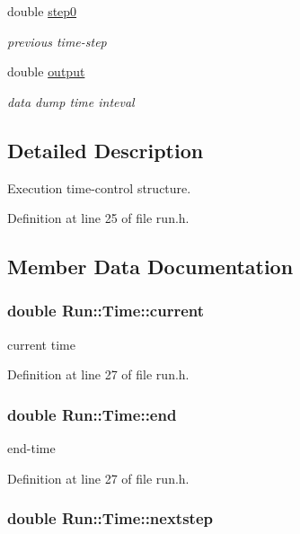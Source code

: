 \begin{CompactItemize}
double \hyperlink{structRun_1_1Time_f061d3f8babfe196d06003e34bc23b42}{step0}
\begin{CompactList}\small\item\em previous time-step \item\end{CompactList}\item 
double \hyperlink{structRun_1_1Time_f8cf74f66df79569a1b50da8b8fbe45f}{output}
\begin{CompactList}\small\item\em data dump time inteval \item\end{CompactList}\end{CompactItemize}


\subsection{Detailed Description}
Execution time-control structure. 

Definition at line 25 of file run.h.

\subsection{Member Data Documentation}
\hypertarget{structRun_1_1Time_e620752b0a0b7f8f5bf209ae4c978aad}{
\subsubsection[{current}]{\setlength{\rightskip}{0pt plus 5cm}double {\bf Run::Time::current}}}
\label{structRun_1_1Time_e620752b0a0b7f8f5bf209ae4c978aad}


current time 



Definition at line 27 of file run.h.\hypertarget{structRun_1_1Time_7cffeec5b6e31da1fa8c3edbea5ec35c}{
\subsubsection[{end}]{\setlength{\rightskip}{0pt plus 5cm}double {\bf Run::Time::end}}}
\label{structRun_1_1Time_7cffeec5b6e31da1fa8c3edbea5ec35c}


end-time 



Definition at line 27 of file run.h.\hypertarget{structRun_1_1Time_71d418b85f36a6ee0f2f9410b8c8025e}{
\subsubsection[{nextstep}]{\setlength{\rightskip}{0pt plus 5cm}double {\bf Run::Time::nextstep}}}
\label{structRun_1_1Time_71d418b85f36a6ee0f2f9410b8c8025e}



